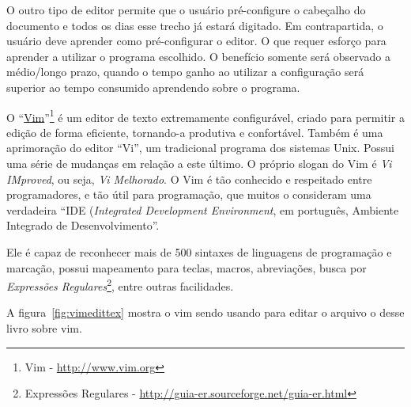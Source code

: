 O outro tipo de editor permite que o usuário pré-configure o cabeçalho do
documento e todos os dias esse trecho já estará digitado. Em contrapartida, o
usuário deve aprender como pré-configurar o editor. O que requer esforço para
aprender a utilizar o programa escolhido. O benefício somente será observado a
médio/longo prazo, quando o tempo ganho ao utilizar a configuração será
superior ao tempo consumido aprendendo sobre o programa.

O ``\href{http://www.vim.org}{Vim}''\footnote{Vim - \url{http://www.vim.org}}
 é um editor de texto extremamente configurável, criado para
permitir a edição de forma eficiente, tornando-a produtiva e confortável. 
Também é uma aprimoração do editor ``Vi'', um tradicional programa dos
sistemas Unix. Possui uma série de mudanças em relação a este último. O
próprio slogan do Vim é {\em Vi IMproved}, ou seja, {\em Vi Melhorado}.  O Vim
é tão conhecido e respeitado entre programadores, e tão útil para programação,
que muitos o consideram uma verdadeira ``IDE (\textit{Integrated 
Development Environment}, em português, Ambiente Integrado de 
Desenvolvimento''.

Ele é capaz de reconhecer mais de 500 sintaxes de linguagens de programação e
marcação, possui mapeamento para teclas, macros, abreviações, busca por
{\em{Expressões
Regulares}}\footnote{Expressões Regulares - 
\url{http://guia-er.sourceforge.net/guia-er.html}}, entre outras facilidades.

A figura~\ref{fig:vimedittex} mostra o vim sendo usando para editar o arquivo
o desse livro sobre vim.

